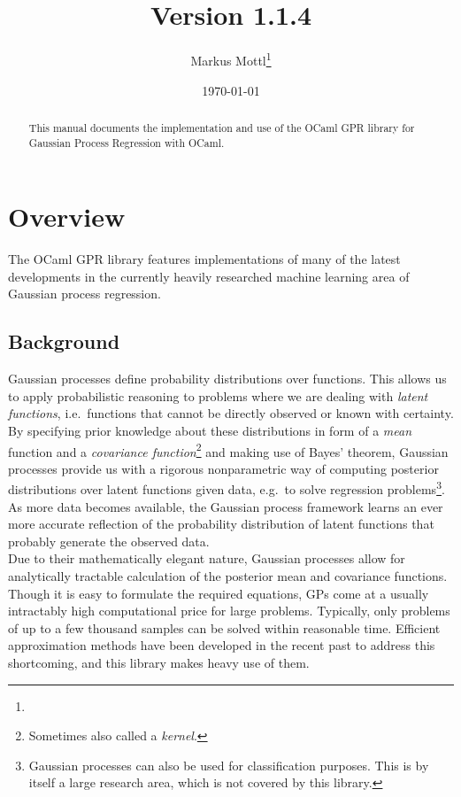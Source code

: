 \documentclass[10pt]{report}
\title{\footahref{http://mmottl.github.org/gpr}{Gaussian Process Regression
with OCaml}\\Version 1.1.4}
\author{Markus Mottl\footnote{\mail}}
\date{\today}
\begin{document}
\maketitle

\begin{abstract}

This manual documents the implementation and use of the OCaml GPR
library for Gaussian Process Regression with OCaml.

\end{abstract}

\tableofcontents

\chapter{Overview}

The OCaml GPR library features implementations of many of the latest
developments in the currently heavily researched machine learning area of
Gaussian process regression.

\section{Background}

Gaussian processes define probability distributions over functions.
This allows us to apply probabilistic reasoning to problems where we are
dealing with \emph{latent functions}, i.e.\ functions that cannot be directly
observed or known with certainty.  By specifying prior knowledge about
these distributions in form of a \emph{mean} function and a \emph{covariance
function}\footnote{Sometimes also called a \emph{kernel}.} and making use of
Bayes' theorem, Gaussian processes provide us with a rigorous nonparametric
way of computing posterior distributions over latent functions given data,
e.g.\ to solve regression problems\footnote{Gaussian processes can also be
used for classification purposes.  This is by itself a large research area,
which is not covered by this library.}.  As more data becomes available,
the Gaussian process framework learns an ever more accurate reflection of
the probability distribution of latent functions that probably generate the
observed data.\\

Due to their mathematically elegant nature, Gaussian processes allow for
analytically tractable calculation of the posterior mean and covariance
functions.  Though it is easy to formulate the required equations, GPs come at a
usually intractably high computational price for large problems.  Typically,
only problems of up to a few thousand samples can be solved within reasonable
time.  Efficient approximation methods have been developed in the recent past to
address this shortcoming, and this library makes heavy use of them.\\
\end{document}
